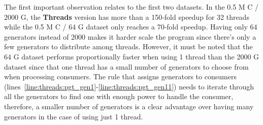 The first important observation relates to the first two datasets. In the 0.5 M
C / 2000 G, the \textbf{Threads} version has more than a 150-fold speedup for 32
threads while the 0.5 M C / 64 G dataset only reaches a 70-fold speedup. Having
only 64 generators instead of 2000 makes it harder scale the program since
there's only a few generators to distribute among threads. However, it must be
noted that the 64 G dataset performs proportionally faster when using 1 thread
than the 2000 G dataset since that one thread has a small number of generators
to choose from when processing consumers. The rule that assigns generators to
consumers (lines~\ref{line:threads:pgt_gen1}-\ref{line:threads:pgt_gen11}) needs
to iterate through all the generators to find one with enough power to handle
the consumer, therefore, a smaller number of generators is a clear advantage
over having many generators in the case of using just 1 thread.

